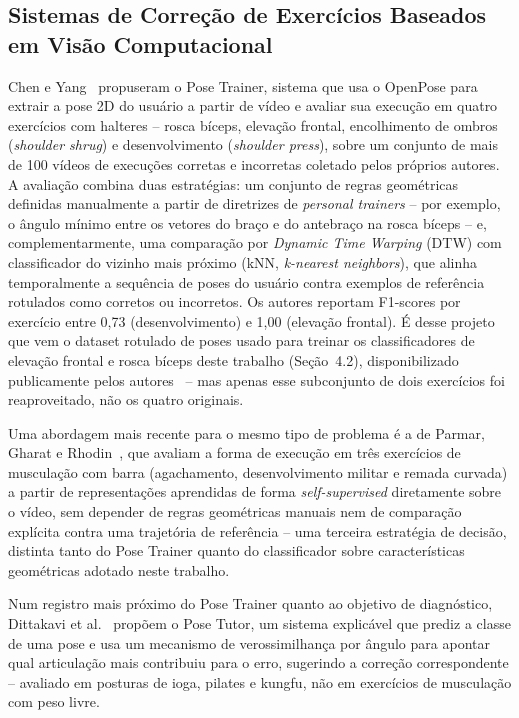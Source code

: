 \documentclass[12pt]{article}
\begin{document}
\subsection{Sistemas de Correção de Exercícios Baseados em Visão Computacional}

Chen e Yang~\cite{chen2020poseexercise} propuseram o Pose Trainer, sistema
que usa o OpenPose para extrair a pose 2D do usuário a partir de vídeo e
avaliar sua execução em quatro exercícios com halteres -- rosca bíceps,
elevação frontal, encolhimento de ombros (\textit{shoulder shrug}) e
desenvolvimento (\textit{shoulder press}), sobre um conjunto de mais de
100 vídeos de execuções corretas e incorretas coletado pelos próprios
autores. A avaliação combina duas estratégias: um conjunto de regras
geométricas definidas manualmente a partir de diretrizes de
\textit{personal trainers} -- por exemplo, o ângulo mínimo entre os vetores
do braço e do antebraço na rosca bíceps -- e, complementarmente, uma
comparação por \textit{Dynamic Time Warping} (DTW) com classificador do
vizinho mais próximo (kNN, \textit{k-nearest neighbors}), que alinha temporalmente a sequência de poses do
usuário contra exemplos de referência rotulados como corretos ou incorretos.
Os autores reportam F1-scores por exercício entre 0,73 (desenvolvimento) e
1,00 (elevação frontal). É desse projeto que vem o dataset rotulado de
poses usado para treinar os classificadores de elevação frontal e rosca
bíceps deste trabalho (Seção~4.2), disponibilizado publicamente pelos
autores~\cite{chen2020posetrainerrepo} -- mas apenas esse subconjunto de
dois exercícios foi reaproveitado, não os quatro originais.

Uma abordagem mais recente para o mesmo tipo de problema é a de Parmar,
Gharat e Rhodin~\cite{parmar2022workout}, que avaliam a forma de execução
em três exercícios de musculação com barra (agachamento, desenvolvimento
militar e remada curvada) a partir de representações aprendidas de forma
\textit{self-supervised} diretamente sobre o vídeo, sem depender de
regras geométricas manuais nem de comparação explícita contra uma
trajetória de referência -- uma terceira estratégia de decisão, distinta
tanto do Pose Trainer quanto do classificador sobre características
geométricas adotado neste trabalho.

Num registro mais próximo do Pose Trainer quanto ao objetivo de
diagnóstico, Dittakavi et al.~\cite{dittakavi2022posetutor} propõem o Pose
Tutor, um sistema explicável que prediz a classe de uma pose e usa um
mecanismo de verossimilhança por ângulo para apontar qual articulação mais
contribuiu para o erro, sugerindo a correção correspondente -- avaliado em
posturas de ioga, pilates e kungfu, não em exercícios de musculação com
peso livre.
\end{document}
